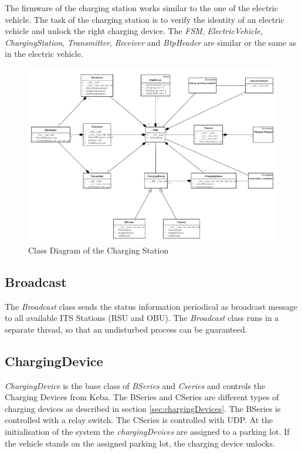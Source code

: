 The firmware of the charging station works similar to the one of the electric vehicle. The task of the charging station is to verify the identity of an electric vehicle and unlock the right charging device. The \textit{FSM}, \textit{ElectricVehicle}, \textit{ChargingStation}, \textit{Transmitter}, \textit{Receiver} and \textit{BtpHeader} are similar or the same as in the electric vehicle.

\begin{figure}[htb]
	\centering
	\includegraphics[width=1\textwidth]{images/class_RSU}
	\caption{Class Diagram of the Charging Station}
	\label{fig:class_cs}
\end{figure}

\subsection{Broadcast}

The \textit{Broadcast} class sends the status information periodical as broadcast message to all available ITS Stations (RSU and OBU). The \textit{Broadcast} class runs in a separate thread, so that an undisturbed process can be guaranteed. 

\subsection{ChargingDevice}

\textit{ChargingDevice} is the base class of \textit{BSeries} and \textit{Cseries} and controls the Charging Devices from Keba. The BSeries and CSeries are different types of charging devices as described in section \ref{sec:chargingDevices}. The BSeries is controlled with a relay switch. The CSeries is controlled with UDP. At the initialisation of the system the \textit{chargingDevices} are assigned to a parking lot. If the vehicle stands on the assigned parking lot, the charging device unlocks.   



